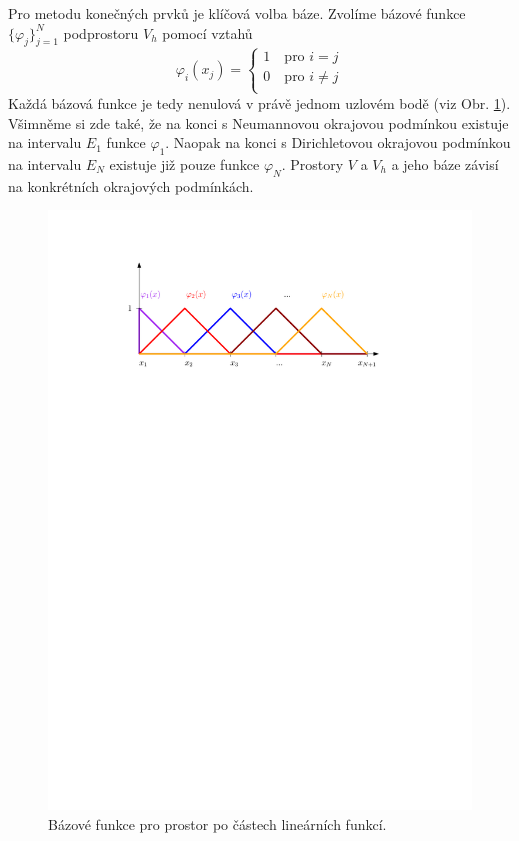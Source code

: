 Pro metodu konečných prvků je klíčová volba báze.
Zvolíme bázové funkce $\{\varphi_j\}_{j=1}^N$ podprostoru $V_h$ pomocí vztahů
\begin{equation*}
      \varphi_i(x_j) = 
        \begin{cases}
          1 \quad \textrm{pro } i=j\\
          0 \quad \textrm{pro } i\neq j\\
        \end{cases}
\end{equation*}
Každá bázová funkce je tedy nenulová v právě jednom uzlovém bodě (viz Obr. \ref{fig:base_1d_lin}). Všimněme si zde také, že na konci s Neumannovou okrajovou podmínkou existuje na intervalu $E_1$ funkce $\varphi_1$. Naopak na konci s Dirichletovou okrajovou podmínkou na intervalu $E_N$ existuje již pouze funkce $\varphi_N$. Prostory $V$ a $V_h$ a jeho báze závisí na konkrétních okrajových podmínkách.
\begin{figure}[h]
\centering
\includegraphics{base_1d_lin_termoska}
\caption{Bázové funkce pro prostor po částech lineárních funkcí.}
\label{fig:base_1d_lin}
\end{figure}

